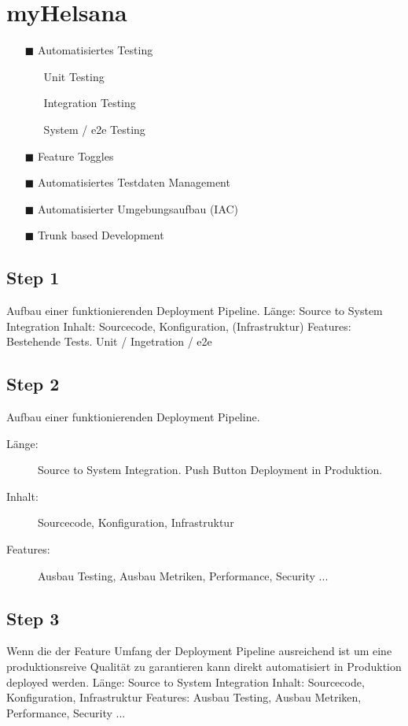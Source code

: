 \documentclass[a4paper]{article}
\begin{document}
\section*{myHelsana}
\begin{itemize}
  \item[\textcolor{ipt-light-blue}{$\blacksquare$}] Automatisiertes Testing
  \begin{itemize}
    \item[] Unit Testing
    \item[] Integration Testing
    \item[] System / e2e Testing
  \end{itemize}
  \item[\textcolor{ipt-green}{$\blacksquare$}] Feature Toggles
  \item[\textcolor{ipt-light-red}{$\blacksquare$}] Automatisiertes Testdaten Management
  \item[\textcolor{ipt-light-red}{$\blacksquare$}] Automatisierter Umgebungsaufbau (IAC)
  \item[\textcolor{ipt-light-red}{$\blacksquare$}] Trunk based Development
\end{itemize}

\subsection*{Step 1}
Aufbau einer funktionierenden Deployment Pipeline.
Länge: Source to System Integration
Inhalt: Sourcecode, Konfiguration, (Infrastruktur)
Features: Bestehende Tests. Unit / Ingetration / e2e

\subsection*{Step 2}
Aufbau einer funktionierenden Deployment Pipeline.
\begin{description}
  \item[Länge:] Source to System Integration. Push Button Deployment in Produktion.
  \item[Inhalt:] Sourcecode, Konfiguration, Infrastruktur
  \item[Features:] Ausbau Testing, Ausbau Metriken, Performance, Security ...
\end{description}

\subsection*{Step 3}
Wenn die der Feature Umfang der Deployment Pipeline ausreichend ist um eine produktionsreive Qualität zu garantieren kann direkt automatisiert in Produktion deployed werden.
Länge: Source to System Integration
Inhalt: Sourcecode, Konfiguration, Infrastruktur
Features: Ausbau Testing, Ausbau Metriken, Performance, Security ...
\end{document}
